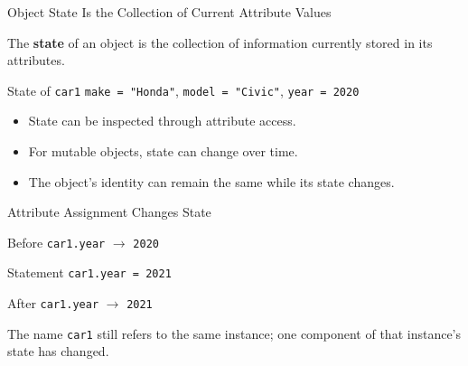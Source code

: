 \documentclass[aspectratio=169,10pt]{beamer}
\begin{document}
\begin{frame}{Object State Is the Collection of Current Attribute Values}
  \begin{cpdefinition}
    The \textbf{state} of an object is the collection of information currently stored in its attributes.
  \end{cpdefinition}

  \begin{block}{State of \texttt{car1}}
    \texttt{make = "Honda"}, \texttt{model = "Civic"}, \texttt{year = 2020}
  \end{block}

  \begin{itemize}
    \item State can be inspected through attribute access.
    \item For mutable objects, state can change over time.
    \item The object's identity can remain the same while its state changes.
  \end{itemize}
\end{frame}

\begin{frame}{Attribute Assignment Changes State}
  \begin{block}{Before}
    \texttt{car1.year} $\rightarrow$ \texttt{2020}
  \end{block}

  \begin{block}{Statement}
    \texttt{car1.year = 2021}
  \end{block}

  \begin{block}{After}
    \texttt{car1.year} $\rightarrow$ \texttt{2021}
  \end{block}

  \begin{keyidea}
    The name \texttt{car1} still refers to the same instance; one component of that instance's state has changed.
  \end{keyidea}
\end{frame}
\end{document}
